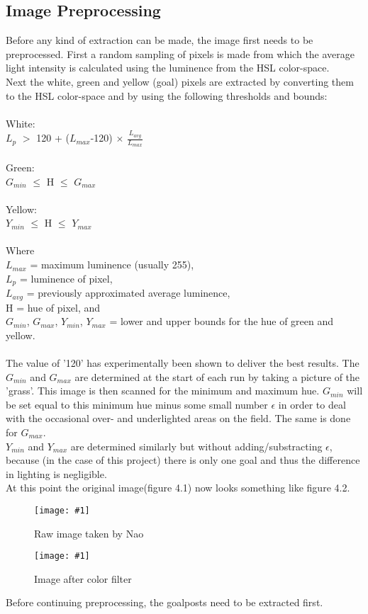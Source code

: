 \documentclass{ba-kecs}
\numberwithin{figure}{section}
\newcommand{\dkepic}[2]{ %
	\begin{figure}[H] %
	\texttt{[image: \#1]}
	\caption{#2}
	\label{#1}
	\end{figure}
}
\begin{document}
\subsection{Image Preprocessing}
Before any kind of extraction can be made, the image first needs to be preprocessed. First a random sampling of pixels is made from which the average light intensity is calculated using the luminence from the HSL color-space.\\
Next the white, green and yellow (goal) pixels are extracted by converting them to the HSL color-space and by using the following thresholds and bounds:\\ \\
White:\\ $L_{p}$ $>$ 120 + ($L_{max}$-120) $\times$ $\frac{L_{avg}}{L_{max}}$ \\ \\
Green:\\ $G_{min}$ $\leq$ H $\leq$ $G_{max}$\\ \\
Yellow:\\ $Y_{min}$ $\leq$ H $\leq$ $Y_{max}$\\ \\
Where \\
$L_{max}$ = maximum luminence (usually 255),\\
$L_{p}$ = luminence of pixel, \\
$L_{avg}$ = previously approximated average luminence, \\
H = hue of pixel, and \\
$G_{min}$, $G_{max}$, $Y_{min}$, $Y_{max}$ = lower and upper bounds for the hue of green and yellow.\\ \\
The value of '120' has experimentally been shown to deliver the best results. The $G_{min}$ and $G_{max}$ are determined at the start of each run by taking a picture of the 'grass'. This image is then scanned for the minimum and maximum hue. $G_{min}$ will be set equal to this minimum hue minus some small number $\epsilon$ in order to deal with the occasional over- and underlighted areas on the field. The same is done for $G_{max}$.\\
$Y_{min}$ and $Y_{max}$ are determined similarly but without adding/substracting $\epsilon$, because (in the case of this project) there is only one goal and thus the difference in lighting is negligible.\\
At this point the original image(figure 4.1) now looks something like figure 4.2.\\
\dkepic{figure_IP1}{Raw image taken by Nao}
\dkepic{figure_IP2}{Image after color filter}
Before continuing preprocessing, the goalposts need to be extracted first.
\end{document}
